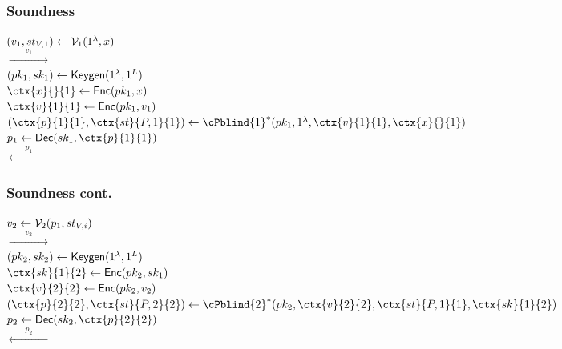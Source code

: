 \documentclass{beamer}
\begin{document}
\begin{frame}
	\frametitle{Soundness}
	$(v_1, st_{V, 1})\leftarrow\mathcal{V}_1(1^\lambda, x)$
	\pause
	\\\hspace*{\fill}$\xrightarrow{\qquad v_1\qquad}$\hspace*{\fill}
	\pause
	\\\hspace*{\fill}$(pk_1, sk_1)\leftarrow\mathsf{Keygen}(1^\lambda, 1^L)$
	\pause
	\\\hspace*{\fill}$\ctx{x}{}{1}\leftarrow\Enc(pk_1, x)$
	\pause
	\\\hspace*{\fill}$\ctx{v}{1}{1}\leftarrow\Enc(pk_1, v_1)$
	\pause
	\\\hspace*{\fill}$(\ctx{p}{1}{1}, \ctx{st}{P, 1}{1})\leftarrow\cPblind{1}^*(pk_1, 1^\lambda, \ctx{v}{1}{1}, \ctx{x}{}{1})$
	\pause
	\\\hspace*{\fill}$p_1\leftarrow\Dec(sk_1, \ctx{p}{1}{1})$
	\pause
	\\\hspace*{\fill}$\xleftarrow{\qquad p_1\qquad}$\hspace*{\fill}
\end{frame}

\begin{frame}
	\frametitle{Soundness cont.}
	$v_2\leftarrow\mathcal{V}_2(p_{1}, st_{V, i})$
	\pause
	\\\hspace*{\fill}$\xrightarrow{\qquad v_2\qquad}$\hspace*{\fill}
	\pause
	\\\hspace*{\fill}$(pk_2, sk_2)\leftarrow\mathsf{Keygen}(1^\lambda, 1^L)$
	\pause
	\\\hspace*{\fill}$\ctx{sk}{1}{2}\leftarrow\Enc(pk_2, sk_{1})$
	\pause
	\\\hspace*{\fill}$\ctx{v}{2}{2}\leftarrow\Enc(pk_2, v_2)$
	\pause
	\\\hspace*{\fill}$(\ctx{p}{2}{2}, \ctx{st}{P, 2}{2})\leftarrow\cPblind{2}^*(pk_2, \ctx{v}{2}{2}, \ctx{st}{P, 1}{1}, \ctx{sk}{1}{2})$
	\pause
	\\\hspace*{\fill}$p_2\leftarrow\Dec(sk_2, \ctx{p}{2}{2})$
	\pause
	\\\hspace*{\fill}$\xleftarrow{\qquad p_2\qquad}$\hspace*{\fill}
\end{frame}
\end{document}
